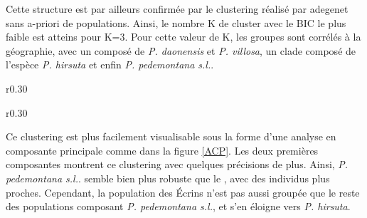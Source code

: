 Cette structure est par ailleurs confirmée par le clustering réalisé par adegenet sans a-priori de populations. Ainsi, le nombre K de cluster avec le BIC le plus faible est atteins pour K=3. Pour cette valeur de K, les groupes sont corrélés à la géographie, avec un  composé de \textit{P. daonensis} et \textit{P. villosa}, un clade composé de l'espèce \textit{P. hirsuta} et enfin \textit{P. pedemontana s.l.}.


\begin{wrapfigure}{r}{0.30\textwidth}
	\vspace{-40pt}
	\begin{center}
	\end{center}
	\vspace{-20pt}
	\caption{\textbf{cluster} cluster}
    \label{cluster}
\end{wrapfigure}

\begin{wrapfigure}{r}{0.30\textwidth}
	\vspace{-40pt}
	\begin{center}
	\end{center}
	\vspace{-20pt}
	\caption{\textbf{ACP} ACP}
    \label{ACP}
\end{wrapfigure}

Ce clustering est plus facilement visualisable sous la forme d'une analyse en composante principale comme dans la figure \ref{ACP}. Les deux premières composantes montrent ce clustering avec quelques précisions de plus. Ainsi, \textit{P. pedemontana s.l.}. semble bien plus robuste que le , avec des individus plus proches. Cependant, la population des Écrins n'est pas aussi groupée que le reste des populations composant \textit{P. pedemontana s.l.}, et s'en éloigne vers \textit{P. hirsuta}.


